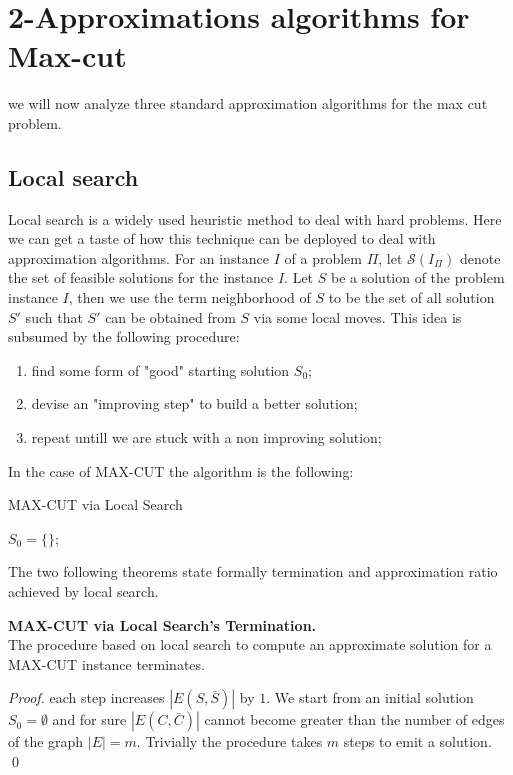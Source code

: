 \section{2-Approximations algorithms for Max-cut}
we will now analyze three standard approximation algorithms for the max cut problem.

\subsection{Local search}
Local search is a widely used heuristic method to deal with hard problems.
Here we can get a taste of how this technique can be deployed to deal with approximation algorithms.
For an instance $I$ of a problem $ \Pi $, let $\mathcal{S}(I_{\Pi})$ denote the set of feasible solutions for the instance $I$.
Let $S$ be a solution of the problem instance $I$, then we use the term neighborhood of $S$ to be  the  set  of  all solution $S'$ such that $S'$ can be obtained from $S$ via some local moves.
This idea is subsumed by the following procedure:
\begin{enumerate}
  \item find some form of "good" starting solution $S_0$;
  \item devise an "improving step" to build a better solution;
  \item repeat untill we are stuck with a non improving solution;
\end{enumerate}

In the case of MAX-CUT the algorithm is the following:

\begin{algorithm}[H]
\SetAlgoLined
{}
\caption{MAX-CUT via Local Search}
$S_0 =\{\}$;\\
{
}
\end{algorithm}
\bigskip

The two following theorems state formally termination and approximation ratio achieved by local search.

\begin{theorem}{\textbf{MAX-CUT via Local Search's Termination.}} 
\\
 The procedure based on local search to compute an approximate solution for a MAX-CUT instance terminates.
\end{theorem}
\begin{proof}
  each step increases $|E(S,\bar{S})|$ by $1$. We start from an initial solution $ S_0 = \emptyset $ and for sure $|E(C,\bar{C})|$ cannot become greater than the number of edges of the graph $ |E| = m $.
  Trivially the procedure takes $m$ steps to emit a solution.
  \qed
\end{proof}

